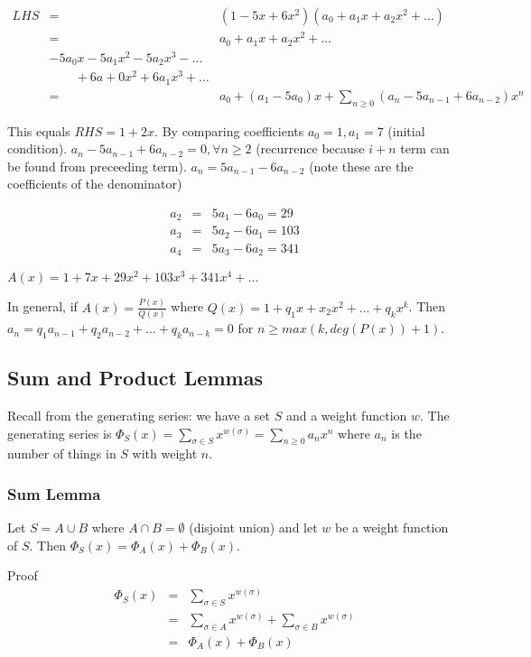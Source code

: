 \documentclass{article}
\begin{document}
\begin{eqnarray*}
	LHS &=& (1-5x+6x^2)(a_0 + a_1x + a_2x^2 + \dots ) \\
	&=& a_0 + a_1x + a_2x^2 + \dots \\
	& -5a_0x - 5a_1x^2 -5a_2x^3 - \dots \\
	& \qquad + 6a+0x^2 + 6a_1x^3 + \dots \\
	&=& a_0 + (a_1-5a_0)x + \sum_{n \ge 0}(a_n - 5a_{n-1} + 6a_{n-2})x^n
\end{eqnarray*}

This equals $RHS = 1 + 2x$. By comparing coefficients $a_0 = 1, a_1 = 7$ (initial condition). $a_n - 5a_{n-1}+6a_{n-2} = 0, \forall n \ge 2$ (recurrence because $i+n$ term can be found from preceeding term). $a_n = 5a_{n-1} - 6a_{n-2}$ (note these are the coefficients of the denominator)

\begin{eqnarray*}
	a_2 &=& 5a_1 - 6a_0 = 29 \\
	a_3 &=&  5a_2 - 6a_1 = 103 \\
	a_4 &=&  5a_3 - 6a_2 = 341
\end{eqnarray*}

$A(x) = 1 + 7x + 29x^2 + 103x^3 + 341x^4 + \dots$

In general, if $A(x) = \frac{P(x)}{Q(x)}$ where $Q(x) = 1 + q_1x + x_2x^2 + \dots + q_k x^k$. Then $a_n = q_1 a_{n-1} + q_2a_{n-2} + \dots + q_ka_{n-k}=0$ for $n \ge max(k,deg(P(x)) + 1)$.

\subsection{Sum and Product Lemmas}
Recall from the generating series: we have a set $S$ and a weight function $w$. The generating series is $\Phi_S(x) = \sum_{\sigma \in S}x^{w(\sigma)} = \sum_{n \ge 0}a_nx^n$ where $a_n$ is the number of things in $S$ with weight $n$.

\subsubsection{Sum Lemma}
Let $S = A \cup B$ where $A \cap B = \emptyset$ (disjoint union) and let $w$ be a weight function of $S$. Then $\Phi_S(x) = \Phi_A(x) + \Phi_B(x)$.

Proof\\
\begin{eqnarray*} 
	\Phi_S(x) &=& \sum_{\sigma \in S}x^{w(\sigma)}\\
	&=& \sum_{\sigma \in A}x^{w(\sigma)} + \sum_{\sigma \in B}x^{w(\sigma)}\\
	&=& \Phi_A(x) + \Phi_B(x)
\end{eqnarray*}
\end{document}
